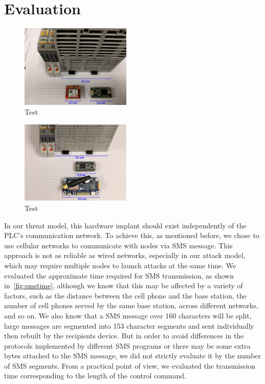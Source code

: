 \section{Evaluation}
\label{sec:evaluation}

\begin{figure}[th]
	\includegraphics[width=0.47\textwidth]{figures/eval_size_old}
	\centering
	\caption{Test}
	\label{fig:eval_sizei_old}
\end{figure}

\begin{figure}[th]
	\includegraphics[width=0.47\textwidth]{figures/eval_size}
	\centering
	\caption{Test}
	\label{fig:eval_size}
\end{figure}


In our threat model, this hardware implant should exist independently of the PLC's communication network. To achieve this, as mentioned before, we chose to use cellular networks to communicate with nodes via SMS message. This approach is not as reliable as wired networks, especially in our attack model, which may require multiple nodes to launch attacks at the same time. We evaluated the approximate time required for SMS transmission, as shown in~\autoref{fig:smstime}, although we know that this may be affected by a variety of factors, such as the distance between the cell phone and the base station, the number of cell phones served by the same base station, across different networks, and so on. We also know that a SMS message over 160 characters will be split, large messages are segmented into 153 character segments and sent individually then rebuilt by the recipients device. But in order to avoid differences in the protocols implemented by different SMS programs or there may be some extra bytes attached to the SMS message, we did not strictly evaluate it by the number of SMS segments. From a practical point of view, we evaluated the transmission time corresponding to the length of the control command.

